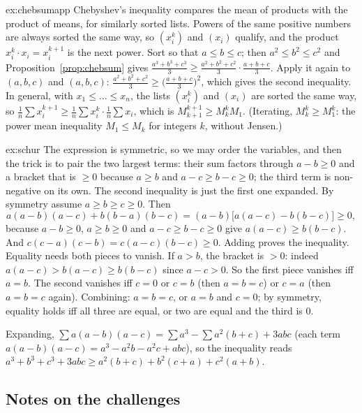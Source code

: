 \begin{solution}{ex:chebsumapp}
\idea Chebyshev's inequality compares the mean of products with the product of means, for similarly sorted lists. Powers of the same positive numbers are always sorted the same way, so $(x_i^k)$ and $(x_i)$ qualify, and the product $x_i^k\cdot x_i=x_i^{k+1}$ is the next power.
\writeup Sort so that $a\le b\le c$; then $a^2\le b^2\le c^2$ and Proposition~\ref{prop:chebsum} gives $\frac{a^3+b^3+c^3}3\ge\frac{a^2+b^2+c^2}3\cdot\frac{a+b+c}3$. Apply it again to $(a,b,c)$ and $(a,b,c)$: $\frac{a^2+b^2+c^2}3\ge\bigl(\frac{a+b+c}3\bigr)^2$, which gives the second inequality. In general, with $x_1\le\dots\le x_n$, the lists $(x_i^k)$ and $(x_i)$ are sorted the same way, so $\frac1n\sum x_i^{k+1}\ge\frac1n\sum x_i^k\cdot\frac1n\sum x_i$, which is $M_{k+1}^{k+1}\ge M_k^kM_1$. (Iterating, $M_k^k\ge M_1^k$: the power mean inequality $M_1\le M_k$ for integers $k$, without Jensen.)
\end{solution}

\begin{solution}{ex:schur}
\idea The expression is symmetric, so we may order the variables, and then the trick is to pair the two largest terms: their sum factors through $a-b\ge0$ and a bracket that is $\ge0$ because $a\ge b$ and $a-c\ge b-c\ge0$; the third term is non-negative on its own. The second inequality is just the first one expanded.
\writeup By symmetry assume $a\ge b\ge c\ge0$. Then
\[
a(a-b)(a-c)+b(b-a)(b-c)=(a-b)\bigl[a(a-c)-b(b-c)\bigr]\ge0,
\]
because $a-b\ge0$, $a\ge b\ge0$ and $a-c\ge b-c\ge0$ give $a(a-c)\ge b(b-c)$. And $c(c-a)(c-b)=c(a-c)(b-c)\ge0$. Adding proves the inequality. Equality needs both pieces to vanish. If $a>b$, the bracket is $>0$: indeed $a(a-c)>b(a-c)\ge b(b-c)$ since $a-c>0$. So the first piece vanishes iff $a=b$. The second vanishes iff $c=0$ or $c=b$ (then $a=b=c$) or $c=a$ (then $a=b=c$ again). Combining: $a=b=c$, or $a=b$ and $c=0$; by symmetry, equality holds iff all three are equal, or two are equal and the third is $0$.

Expanding, $\sum a(a-b)(a-c)=\sum a^3-\sum a^2(b+c)+3abc$ (each term $a(a-b)(a-c)=a^3-a^2b-a^2c+abc$), so the inequality reads $a^3+b^3+c^3+3abc\ge a^2(b+c)+b^2(c+a)+c^2(a+b)$.
\end{solution}

\subsection*{Notes on the challenges}

